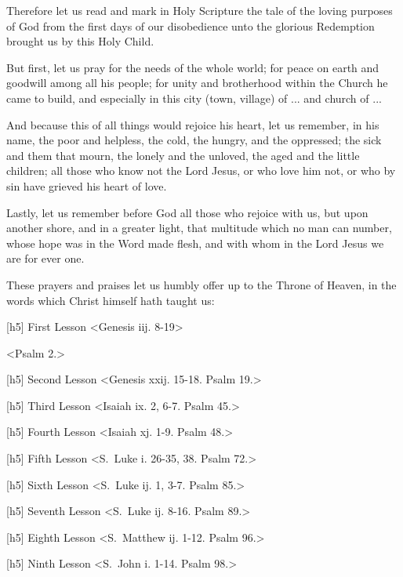 Therefore let us read and mark in Holy Scripture the tale of the loving purposes of God from the first days of our disobedience unto the glorious Redemption brought us by this Holy Child.

But first, let us pray for the needs of the whole world; for peace on earth and goodwill among all his people; for unity and brotherhood within the Church he came to build, and especially in this city (town, village) of ... and church of ...

And because this of all things would rejoice his heart, let us remember, in his name, the poor and helpless, the cold, the hungry, and the oppressed; the sick and them that mourn, the lonely and the unloved, the aged and the little children; all those who know not the Lord Jesus, or who love him not, or who by sin have grieved his heart of love.

Lastly, let us remember before God all those who rejoice with us, but upon another shore, and in a greater light, that multitude which no man can number, whose hope was in the Word made flesh, and with whom in the Lord Jesus we are for ever one.

These prayers and praises let us humbly offer up to the Throne of Heaven, in the words which Christ himself hath taught us:



[h5] First Lesson
<{Genesis iij. 8-19}>

<Psalm 2.>
\begin{multicols}{2}{
[h5] Second Lesson
<{Genesis xxij. 15-18.} Psalm 19.>

[h5] Third Lesson
<{Isaiah ix. 2, 6-7.} Psalm 45.>

[h5] Fourth Lesson
<{Isaiah xj. 1-9.} Psalm 48.>

[h5] Fifth Lesson
<{S.\ Luke i. 26-35, 38.} Psalm 72.>

[h5] Sixth Lesson
<{S.\ Luke ij. 1, 3-7.} Psalm 85.>

[h5] Seventh Lesson
<{S.\ Luke ij. 8-16.} Psalm 89.>

[h5] Eighth Lesson
<{S.\ Matthew ij. 1-12.} Psalm 96.>

[h5] Ninth Lesson
<{S.\ John i. 1-14.} Psalm 98.>
}\end{multicols}

